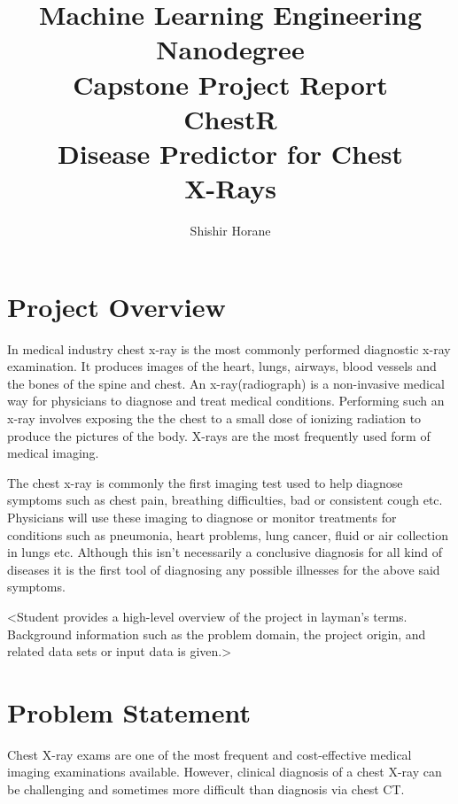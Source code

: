 \documentclass{article}
\begin{document}
    \title{\vspace{-3em}
        Machine Learning Engineering Nanodegree \\
        \large Capstone Project Report \\
        \huge ChestR \\
        \large Disease Predictor for Chest \\
        X-Rays} 
    \author{Shishir Horane}
 
    \maketitle 

    \section{Project Overview}

    In medical industry chest x-ray is the most commonly performed diagnostic x-ray examination. It produces images of the heart, lungs, airways, blood vessels and the bones of the spine and chest. An x-ray(radiograph) is a non-invasive medical way for physicians to diagnose and treat medical conditions. Performing such an x-ray involves exposing the the chest to a small dose of ionizing radiation to produce the pictures of the body. X-rays are the most frequently used form of medical imaging. 
    
    The chest x-ray is commonly the first imaging test used to help diagnose symptoms such as chest pain, breathing difficulties, bad or consistent cough etc. Physicians will use these imaging to diagnose or monitor treatments for conditions such as pneumonia, heart problems, lung cancer, fluid or air collection in lungs etc. Although this isn't necessarily a conclusive diagnosis for all kind of diseases it is the first tool of diagnosing any possible illnesses for the above said symptoms.\cite{xray-details} 

    <Student provides a high-level overview of the project in layman’s terms. Background information such as the problem domain, the project origin, and related data sets or input data is given.>

    \section{Problem Statement}
    Chest X-ray exams are one of the most frequent and cost-effective medical imaging examinations available. However, clinical diagnosis of a chest X-ray can be challenging and sometimes more difficult than diagnosis via chest CT.\cite{nih-kaggle}
    
\end{document}
